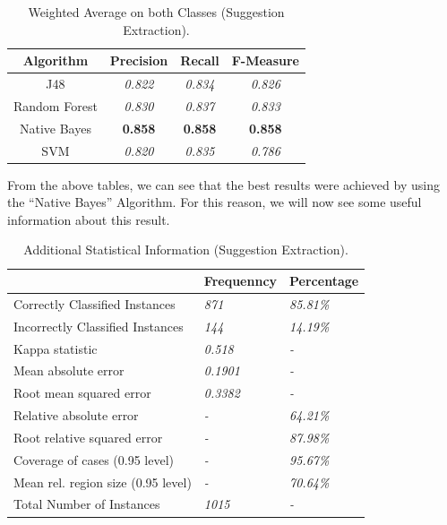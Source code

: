 \begin{table}[H]
\centering
\caption{Weighted Average on both Classes (Suggestion Extraction).}
\label{47_table_ref}
\begin{tabular}{cccc}
\hline
{\bf Algorithm} & {\bf Precision} & {\bf Recall} & {\bf F-Measure} \\ \hline
J48             & {\it 0.822}     & {\it 0.834}  & {\it 0.826}     \\
Random Forest   & {\it 0.830}      & {\it 0.837}  & {\it 0.833}     \\
Native Bayes    & {\bf 0.858}     & {\bf 0.858}  & {\bf 0.858}     \\
SVM             & {\it 0.820}      & {\it 0.835}  & {\it 0.786}     \\ \hline
\end{tabular}
\end{table}

From the above tables, we can see that the best results were achieved by using the ``Native Bayes'' Algorithm. For this reason, we will now see some useful information about this result.

\begin{table}[H]
\centering
\caption{Additional Statistical Information (Suggestion Extraction).}
\label{48_table_rer}
\begin{tabular}{lll}
\hline
                                   & {\bf Frequenncy} & {\bf Percentage} \\ \hline
Correctly Classified Instances     & {\it 871}        & {\it 85.81\%}    \\
Incorrectly Classified Instances   & {\it 144}        & {\it 14.19\%}    \\
Kappa statistic                    & {\it 0.518}      & {\it -}          \\
Mean absolute error                & {\it 0.1901}     & {\it -}          \\
Root mean squared error            & {\it 0.3382}     & {\it -}          \\
Relative absolute error            & {\it -}          & {\it 64.21\%}    \\
Root relative squared error        & {\it -}          & {\it 87.98\%}    \\
Coverage of cases (0.95 level)     & {\it -}          & {\it 95.67\%}    \\
Mean rel. region size (0.95 level) & {\it -}          & {\it 70.64\%}    \\
Total Number of Instances          & {\it 1015}       & {\it -}          \\ \hline
\end{tabular}
\end{table}


